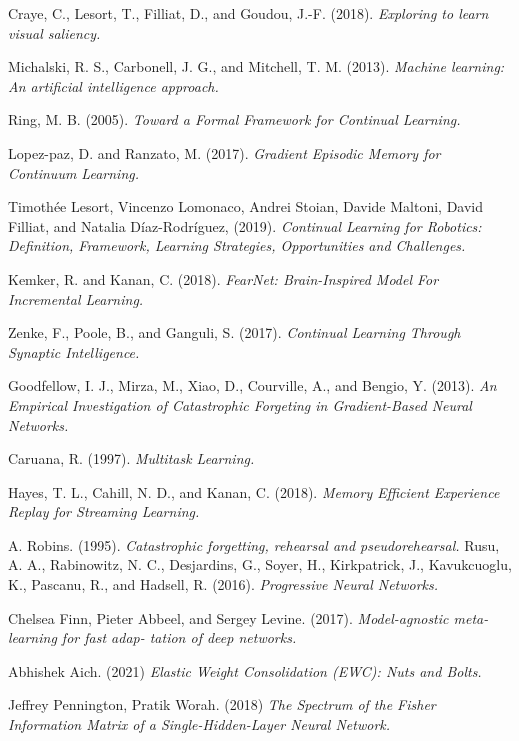 \documentclass[english, LaM, oneside]{sapthesis}%
\begin{document}
\begin{thebibliography}{17}
Craye, C., Lesort, T., Filliat, D., and Goudou, J.-F. (2018). \textit{Exploring to learn visual saliency.}  
 
Michalski, R. S., Carbonell, J. G., and Mitchell, T. M. (2013). \textit{Machine learning: An artificial intelligence approach.}   
  
Ring, M. B. (2005). \textit{Toward a Formal Framework for Continual Learning.}    
 
Lopez-paz, D. and Ranzato, M. (2017). \textit{Gradient Episodic Memory for Continuum Learning.}    


Timothée Lesort, Vincenzo Lomonaco, Andrei Stoian, Davide Maltoni, David Filliat, and Natalia Díaz-Rodríguez, (2019). \textit{Continual Learning for Robotics: Definition, Framework, Learning Strategies, Opportunities and Challenges.} 

Kemker, R. and Kanan, C. (2018). \textit{FearNet: Brain-Inspired Model For Incremental Learning.} 

Zenke, F., Poole, B., and Ganguli, S. (2017). \textit{Continual Learning Through Synaptic Intelligence.} 

Goodfellow, I. J., Mirza, M., Xiao, D., Courville, A., and Bengio, Y. (2013). \textit{An Empirical Investigation of Catastrophic Forgeting in Gradient-Based Neural Networks.} 

Caruana, R. (1997). \textit{Multitask Learning.} 

Hayes, T. L., Cahill, N. D., and Kanan, C. (2018). \textit{Memory Efficient Experience Replay for Streaming Learning.} 
 
A. Robins. (1995). \textit{Catastrophic forgetting, rehearsal and pseudorehearsal.}  
Rusu, A. A., Rabinowitz, N. C., Desjardins, G., Soyer, H., Kirkpatrick, J., Kavukcuoglu, K., Pascanu, R., and Hadsell, R. (2016). \textit{Progressive Neural Networks.}     
 
Chelsea Finn, Pieter Abbeel, and Sergey Levine. (2017). \textit{Model-agnostic meta-learning for fast adap- tation of deep networks.} 

Abhishek Aich. (2021) \textit{Elastic Weight Consolidation (EWC): Nuts and Bolts.}

Jeffrey Pennington, Pratik Worah. (2018) \textit{The Spectrum of the Fisher Information Matrix of a Single-Hidden-Layer Neural Network.}


\end{thebibliography}
\end{document}
